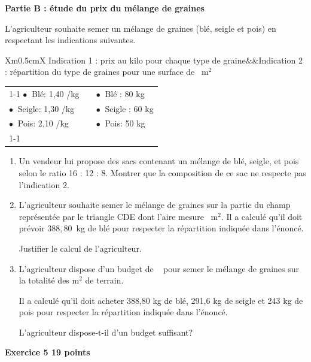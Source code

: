 \documentclass[11pt]{article}
\newcommand{\euro}{\eurologo{}}
\begin{document}
\medskip

\textbf{Partie B : étude du prix du mélange de graines}

\medskip

L'agriculteur souhaite semer un mélange de graines (blé, seigle et pois) en respectant les indications suivantes.

\medskip

\begin{tabularx}{\linewidth}{Xm{0.5cm}X}
Indication 1 : prix au kilo pour chaque type de graine&&Indication 2 : répartition du type de graines pour une surface de ~m$^2$\\
\end{tabularx}
\begin{tabularx}{\linewidth}{|X|m{0.5cm}|X|}\cline{1-1}\cline{3-3}
$\bullet~$ Blé: 1,40 \euro/kg		&	&$\bullet~$ Blé : 80 kg\\ 
$\bullet~$ Seigle: 1,30 \euro/kg	&	&$\bullet~$ Seigle : 60 kg\\
$\bullet~$ Pois: 2,10 \euro/kg		&	&$\bullet~$ Pois: 50 kg\\ \cline{1-1}\cline{3-3}
\end{tabularx}

\medskip

\begin{enumerate}
\item Un vendeur lui propose des sacs contenant un mélange de blé, seigle, et pois selon le ratio 16 : 12 : 8. Montrer que la composition de ce sac ne respecte pas l'indication 2.
\item L'agriculteur souhaite semer le mélange de graines sur la partie du champ représentée par le triangle CDE dont l'aire mesure ~m$^2$. Il a calculé qu'il doit prévoir $388,80$~kg de blé pour respecter la répartition indiquée dans l'énoncé.

Justifier le calcul de l'agriculteur.
\item L'agriculteur dispose d'un budget de ~\euro{} pour semer le mélange de graines sur la totalité des  m$^2$ de terrain.

Il a calculé qu'il doit acheter 388,80 kg de blé, 291,6 kg de seigle et 243 kg de pois pour respecter la répartition indiquée dans l'énoncé.

L'agriculteur dispose-t-il d'un budget suffisant?
\end{enumerate}

\bigskip

\textbf{Exercice 5 \hfill 19 points}
\end{document}
